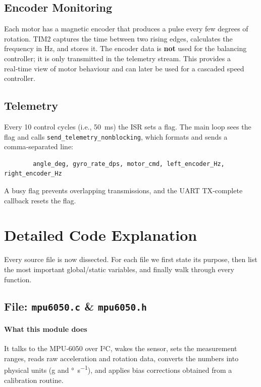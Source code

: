 \documentclass[12pt,a4paper]{article}
\newcommand{\file}[1]{\texttt{#1}}
\newcommand{\func}[1]{\texttt{#1}}
\begin{document}
	\subsection{Encoder Monitoring}
	Each motor has a magnetic encoder that produces a pulse every few degrees of rotation. TIM2 captures the time between two rising edges, calculates the frequency in Hz, and stores it.  
	The encoder data is \textbf{not} used for the balancing controller; it is only transmitted in the telemetry stream. This provides a real‑time view of motor behaviour and can later be used for a cascaded speed controller.
	
	\subsection{Telemetry}
	Every 10 control cycles (i.e., \SI{50}{\milli\second}) the ISR sets a flag.  
	The main loop sees the flag and calls \func{send\_telemetry\_nonblocking}, which formats and sends a comma‑separated line:
	\begin{verbatim}
		angle_deg, gyro_rate_dps, motor_cmd, left_encoder_Hz, right_encoder_Hz
	\end{verbatim}
	A busy flag prevents overlapping transmissions, and the UART TX‑complete callback resets the flag.
	
	\section{Detailed Code Explanation}
	\label{sec:code}
	
	Every source file is now dissected. For each file we first state its purpose, then list the most important global/static variables, and finally walk through every function.
	
	\subsection{File: \file{mpu6050.c} \& \file{mpu6050.h}}
	\label{subsec:mpu6050}
	\paragraph*{What this module does}
	It talks to the MPU‑6050 over I²C, wakes the sensor, sets the measurement ranges, reads raw acceleration and rotation data, converts the numbers into physical units (\si{g} and \si{\degree\per\second}), and applies bias corrections obtained from a calibration routine.
	
\end{document}
